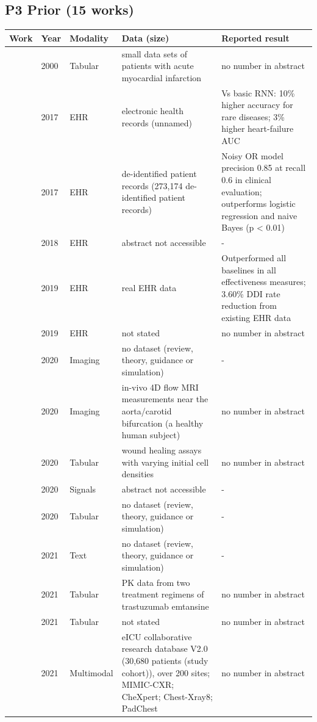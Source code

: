 \subsection*{P3 Prior (15 works)}
\begin{longtable}{@{}p{2.6cm}p{0.7cm}p{1.2cm}p{4.4cm}p{4.6cm}@{}}
\toprule
Work & Year & Modality & Data (size) & Reported result\\
\midrule
\endhead
\cite{steyerberg2000prognostic} & 2000 & Tabular & small data sets of patients with acute myocardial infarction & no number in abstract\\
\cite{choi2017gram} & 2017 & EHR & electronic health records (unnamed) & Vs basic RNN: 10\% higher accuracy for rare diseases; 3\% higher heart-failure AUC\\
\cite{rotmensch2017learning} & 2017 & EHR & de-identified patient records (273,174 de-identified patient records) & Noisy OR model precision 0.85 at recall 0.6 in clinical evaluation; outperforms logistic regression and naive Bayes (p < 0.01)\\
\cite{ma2018kame} & 2018 & EHR & abstract not accessible & -\\
\cite{shang2019gamenet} & 2019 & EHR & real EHR data & Outperformed all baselines in all effectiveness measures; 3.60\% DDI rate reduction from existing EHR data\\
\cite{subbaswamy2019preventing} & 2019 & EHR & not stated & no number in abstract\\
\cite{castro2020causality} & 2020 & Imaging & no dataset (review, theory, guidance or simulation) & -\\
\cite{kissas2020machine} & 2020 & Imaging & in-vivo 4D flow MRI measurements near the aorta/carotid bifurcation (a healthy human subject) & no number in abstract\\
\cite{lagergren2020biologically} & 2020 & Tabular & wound healing assays with varying initial cell densities & no number in abstract\\
\cite{sahlicostabal2020physics} & 2020 & Signals & abstract not accessible & -\\
\cite{vancalster2020regression} & 2020 & Tabular & no dataset (review, theory, guidance or simulation) & -\\
\cite{kohler2021human} & 2021 & Text & no dataset (review, theory, guidance or simulation) & -\\
\cite{lu2021neural} & 2021 & Tabular & PK data from two treatment regimens of trastuzumab emtansine & no number in abstract\\
\cite{riley2021penalization} & 2021 & Tabular & not stated & no number in abstract\\
\cite{zhang2021empirical} & 2021 & Multimodal & eICU collaborative research database V2.0 (30,680 patients (study cohort)), over 200 sites; MIMIC-CXR; CheXpert; Chest-Xray8; PadChest & no number in abstract\\
\bottomrule
\end{longtable}


